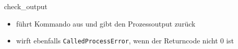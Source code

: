 \begin{frame}[fragile]{check\_output}
	
	\begin{itemize}
		\item f\"uhrt Kommando aus und gibt den Prozessoutput zur\"uck
		\item wirft ebenfalls \texttt{CalledProcessError}, wenn der Returncode nicht 0 ist
	\end{itemize}
\end{frame}


